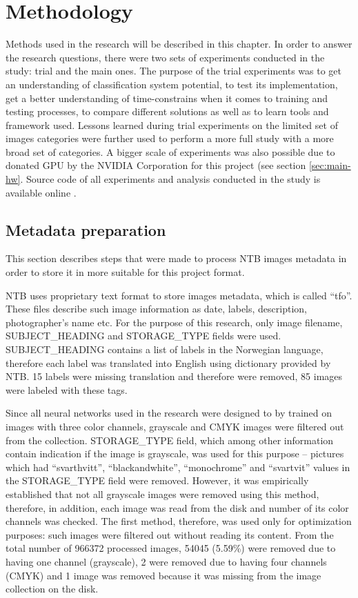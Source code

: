 \chapter{Methodology}
\label{chap:methods}

Methods used in the research will be described in this chapter. In order to answer the research questions, there were two sets of experiments conducted in the study: trial and the main ones. The purpose of the trial experiments was to get an understanding of classification system potential, to test its implementation, get a better understanding of time-constrains when it comes to training and testing processes, to compare different solutions as well as to learn tools and framework used. Lessons learned during trial experiments on the limited set of images categories were further used to perform a more full study with a more broad set of categories. A bigger scale of experiments was also possible due to donated GPU by the NVIDIA Corporation for this project (see section \ref{sec:main-hw}. Source code of all experiments and analysis conducted in the study is available online \cite{master-thesis-src}.


\section{Metadata preparation}
\label{sec:metadata-prep}
This section describes steps that were made to process NTB images metadata in order to store it in more suitable for this project format.

NTB uses proprietary text format to store images metadata, which is called ``tfo''. These files describe such image information as date, labels, description, photographer's name etc. For the purpose of this research, only image filename, SUBJECT\_HEADING and STORAGE\_TYPE fields were used. SUBJECT\_HEADING contains a list of labels in the Norwegian language, therefore each label was translated into English using dictionary provided by NTB. 15 labels were missing translation and therefore were removed, 85 images were labeled with these tags.

Since all neural networks used in the research were designed to by trained on images with three color channels, grayscale and CMYK images were filtered out from the collection. STORAGE\_TYPE field, which among other information contain indication if the image is grayscale, was used for this purpose -- pictures which had ``svarthvitt'', ``blackandwhite'', ``monochrome'' and ``svartvit'' values in the STORAGE\_TYPE field were removed. However, it was empirically established that not all grayscale images were removed using this method, therefore, in addition, each image was read from the disk and number of its color channels was checked. The first method, therefore, was used only for optimization purposes: such images were filtered out without reading its content. From the total number of 966372 processed images, 54045 (5.59\%) were removed due to having one channel (grayscale), 2 were removed due to having four channels (CMYK) and 1 image was removed because it was missing from the image collection on the disk.

